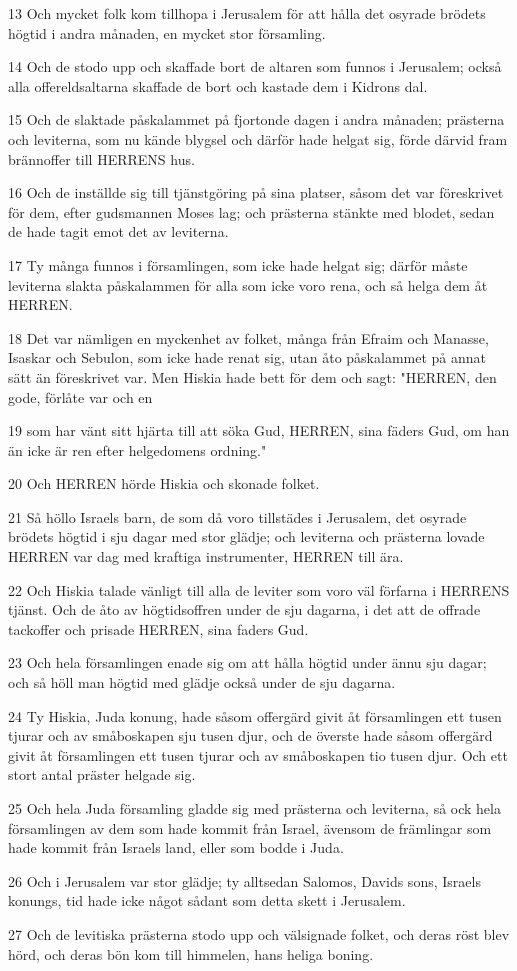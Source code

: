 \par 13 Och mycket folk kom tillhopa i Jerusalem för att hålla det osyrade brödets högtid i andra månaden, en mycket stor församling.
\par 14 Och de stodo upp och skaffade bort de altaren som funnos i Jerusalem; också alla offereldsaltarna skaffade de bort och kastade dem i Kidrons dal.
\par 15 Och de slaktade påskalammet på fjortonde dagen i andra månaden; prästerna och leviterna, som nu kände blygsel och därför hade helgat sig, förde därvid fram brännoffer till HERRENS hus.
\par 16 Och de inställde sig till tjänstgöring på sina platser, såsom det var föreskrivet för dem, efter gudsmannen Moses lag; och prästerna stänkte med blodet, sedan de hade tagit emot det av leviterna.
\par 17 Ty många funnos i församlingen, som icke hade helgat sig; därför måste leviterna slakta påskalammen för alla som icke voro rena, och så helga dem åt HERREN.
\par 18 Det var nämligen en myckenhet av folket, många från Efraim och Manasse, Isaskar och Sebulon, som icke hade renat sig, utan åto påskalammet på annat sätt än föreskrivet var. Men Hiskia hade bett för dem och sagt: "HERREN, den gode, förlåte var och en
\par 19 som har vänt sitt hjärta till att söka Gud, HERREN, sina fäders Gud, om han än icke är ren efter helgedomens ordning."
\par 20 Och HERREN hörde Hiskia och skonade folket.
\par 21 Så höllo Israels barn, de som då voro tillstädes i Jerusalem, det osyrade brödets högtid i sju dagar med stor glädje; och leviterna och prästerna lovade HERREN var dag med kraftiga instrumenter, HERREN till ära.
\par 22 Och Hiskia talade vänligt till alla de leviter som voro väl förfarna i HERRENS tjänst. Och de åto av högtidsoffren under de sju dagarna, i det att de offrade tackoffer och prisade HERREN, sina faders Gud.
\par 23 Och hela församlingen enade sig om att hålla högtid under ännu sju dagar; och så höll man högtid med glädje också under de sju dagarna.
\par 24 Ty Hiskia, Juda konung, hade såsom offergärd givit åt församlingen ett tusen tjurar och av småboskapen sju tusen djur, och de överste hade såsom offergärd givit åt församlingen ett tusen tjurar och av småboskapen tio tusen djur. Och ett stort antal präster helgade sig.
\par 25 Och hela Juda församling gladde sig med prästerna och leviterna, så ock hela församlingen av dem som hade kommit från Israel, ävensom de främlingar som hade kommit från Israels land, eller som bodde i Juda.
\par 26 Och i Jerusalem var stor glädje; ty alltsedan Salomos, Davids sons, Israels konungs, tid hade icke något sådant som detta skett i Jerusalem.
\par 27 Och de levitiska prästerna stodo upp och välsignade folket, och deras röst blev hörd, och deras bön kom till himmelen, hans heliga boning.

